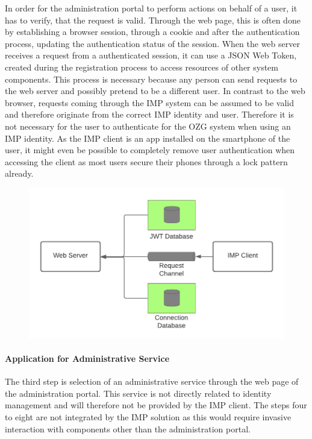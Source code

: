 \documentclass[
     12pt,         %
     a4paper,      %
     BCOR=10mm,version=first,     %
     DIV=14,version=first,        %
     ]{scrreprt}
\begin{document}
In order for the administration portal to perform actions on behalf of a user, it has to verify, that the request is valid. Through the web page, this is often done by establishing a browser session, through a cookie and after the authentication process, updating the authentication status of the session. When the web server receives a request from a authenticated session, it can use a JSON Web Token, created during the registration process to access resources of other system components. This process is necessary because any person can send requests to the web server and possibly pretend to be a different user. In contrast to the web browser, requests coming through the IMP system can be assumed to be valid and therefore originate from the correct IMP identity and user. Therefore it is not necessary for the user to authenticate for the OZG system when using an IMP identity. As the IMP client is an app installed on the smartphone of the user, it might even be possible to completely remove user authentication when accessing the client as most users secure their phones through a lock pattern already.

\begin{figure}[h]
    \centering
    \includegraphics[scale=0.3]{Diagrams/Integration Architecture 1/Overview/Login.png}
\end{figure}

\paragraph{Application for Administrative Service}
The third step is selection of an administrative service through the web page of the administration portal. This service is not directly related to identity management and will therefore not be provided by the IMP client.
The steps four to eight are not integrated by the IMP solution as this would require invasive interaction with components other than the administration portal.
\end{document}

